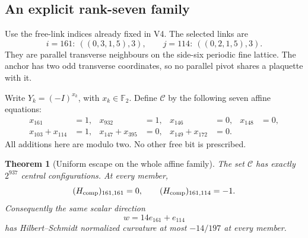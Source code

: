 \documentclass[11pt,oneside]{article}
\newtheorem{theorem}{Theorem}[section]
\begin{document}
\subsection{An explicit rank-seven family}

Use the free-link indices already fixed in V4.
The selected links are
\[
 i=161:\ ((0,3,1,5),3),\qquad
 j=114:\ ((0,2,1,5),3).
\]
They are parallel transverse neighbours on the
side-six periodic fine lattice. The anchor has
two odd transverse coordinates, so no parallel
pivot shares a plaquette with it.

Write \(Y_k=(-I)^{x_k}\), with
\(x_k\in\mathbb F_2\). Define \(\mathcal C\)
by the following seven affine equations:
\begin{equation}\label{eq:f13v6-cylinder}
\begin{aligned}
 x_{161}&=1,&x_{932}&=1,&x_{146}&=0,&x_{148}&=0,\\
 x_{103}+x_{114}&=1,&
 x_{147}+x_{395}&=0,&
 x_{149}+x_{172}&=0 .
\end{aligned}
\end{equation}
All additions here are modulo two. No other
free bit is prescribed.

\begin{theorem}[Uniform escape on the whole affine family]
\label{thm:f13v6-cylinder}
The set \(\mathcal C\) has exactly \(2^{937}\)
central configurations. At every member,
\[
 (H_{\rm comp})_{161,161}=0,\qquad
 (H_{\rm comp})_{161,114}=-1 .
\]
Consequently the same scalar direction
\[
 w=14e_{161}+e_{114}
\]
has Hilbert--Schmidt normalized curvature at
most \(-14/197\) at every member.
\end{theorem}
\end{document}
